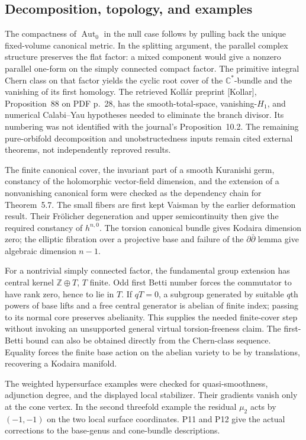 \documentclass[10pt]{article}
\begin{document}
\subsection*{Decomposition, topology, and examples}
The compactness of \(\operatorname{Aut}_0\) in the null case follows by pulling back the unique fixed-volume canonical metric. In the splitting argument, the parallel complex structure preserves the flat factor: a mixed component would give a nonzero parallel one-form on the simply connected compact factor. The primitive integral Chern class on that factor yields the cyclic root cover of the \(\mathbb C^*\)-bundle and the vanishing of its first homology. The retrieved Kollár preprint [Kollar], Proposition 88 on PDF p. 28, has the smooth-total-space, vanishing-\(H_1\), and numerical Calabi–Yau hypotheses needed to eliminate the branch divisor. Its numbering was not identified with the journal’s Proposition 10.2. The remaining pure-orbifold decomposition and unobstructedness inputs remain cited external theorems, not independently reproved results.\par
The finite canonical cover, the invariant part of a smooth Kuranishi germ, constancy of the holomorphic vector-field dimension, and the extension of a nonvanishing canonical form were checked as the dependency chain for Theorem 5.7. The small fibers are first kept Vaisman by the earlier deformation result. Their Frölicher degeneration and upper semicontinuity then give the required constancy of \(h^{n,0}\). The torsion canonical bundle gives Kodaira dimension zero; the elliptic fibration over a projective base and failure of the \(\partial\bar\partial\) lemma give algebraic dimension \(n-1\).\par
For a nontrivial simply connected factor, the fundamental group extension has central kernel \(\mathbb Z\oplus T\), \(T\) finite. Odd first Betti number forces the commutator to have rank zero, hence to lie in \(T\). If \(qT=0\), a subgroup generated by suitable \(q\)th powers of base lifts and a free central generator is abelian of finite index; passing to its normal core preserves abelianity. This supplies the needed finite-cover step without invoking an unsupported general virtual torsion-freeness claim. The first-Betti bound can also be obtained directly from the Chern-class sequence. Equality forces the finite base action on the abelian variety to be by translations, recovering a Kodaira manifold.\par
The weighted hypersurface examples were checked for quasi-smoothness, adjunction degree, and the displayed local stabilizer. Their gradients vanish only at the cone vertex. In the second threefold example the residual \(\mu_2\) acts by \((-1,-1)\) on the two local surface coordinates. P11 and P12 give the actual corrections to the base-genus and cone-bundle descriptions.\par
\end{document}
